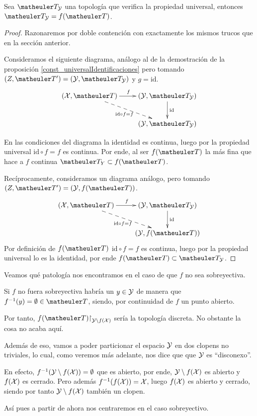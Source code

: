 \begin{prop}
	Sea $\T_\Y$ una topología que verifica la propiedad universal, entonces $\T_\Y=f(\T)$.
\end{prop}
\begin{proof}
	Razonaremos por doble contención con exactamente los mismos trucos que en la sección anterior.
	
	Consideramos el siguiente diagrama, análogo al de la demostración de la proposición \ref{const_universalIdentificaciones} pero tomando $(Z,\T')=(\Y,\T_\Y)$ y $g=\text{id}$.
	\begin{equation*}
	\xymatrix{
		(\X,\T)\ar[r]^{f}\ar@{-->}[rd]_{\text{id}\circ f=f}&(\Y,\T_\Y)\ar[d]^{\text{id}}\\
		&(\Y,\T_\Y)
	}
	\end{equation*}
	
	En las condiciones del diagrama la identidad es continua, luego por la propiedad universal $\text{id}\circ f=f$ es continua. Por ende, al ser $f(\T)$ la más fina que hace a $f$ continua $\T_Y\subset f(\T)$.
	
	Recíprocamente, consideramos un diagrama análogo, pero tomando $(Z,\T')=(\Y,f(\T))$.  
	\begin{equation*}
	\xymatrix{
		(\X,\T)\ar[r]^{f}\ar@{-->}[rd]_{\text{id}\circ f=f}&(\Y,\T_\Y)\ar[d]^{\text{id}}\\
		&(\Y,f(\T))
	}
	\end{equation*}
	Por definición de $f(\T)$ $\text{id}\circ f=f$ es continua, luego por la propiedad universal lo es la identidad, por ende $f(\T)\subset \T_\Y$.
\end{proof}
\begin{obs}[Sobreyectividad]
	Veamos qué patología nos encontramos en el caso de que $f$ no sea sobreyectiva.
	
	Si $f$ no fuera sobreyectiva habría un $y\in\mathcal{Y}$ de manera que $f^{-1}(y)=\emptyset\in\T$, siendo, por continuidad de $f$ un punto abierto.
	
	Por tanto, $f(\T)\restriction_{\Y\setminus f(\X)}$ sería la topología discreta. No obstante la cosa no acaba aquí.
	
	Además de eso, vamos a poder particionar el espacio $\mathcal{Y}$ en dos clopens no triviales, lo cual, como veremos más adelante, nos dice que que $\mathcal{Y}$ es ``disconexo''.
	
	En efecto, $f^{-1}(\mathcal{Y}\setminus f(\mathcal{X}))=\emptyset$ que es abierto, por ende, $\mathcal{Y}\setminus f(\mathcal{X})$ es abierto y $f(\mathcal{X})$ es cerrado. Pero además $f^{-1}(f(\mathcal{X}))=\mathcal{X}$, luego $f(\mathcal{X})$ es abierto y cerrado, siendo por tanto $\mathcal{Y}\setminus f(\mathcal{X})$ también un clopen. 
\end{obs}
Así pues a partir de ahora nos centraremos en el caso sobreyectivo.

